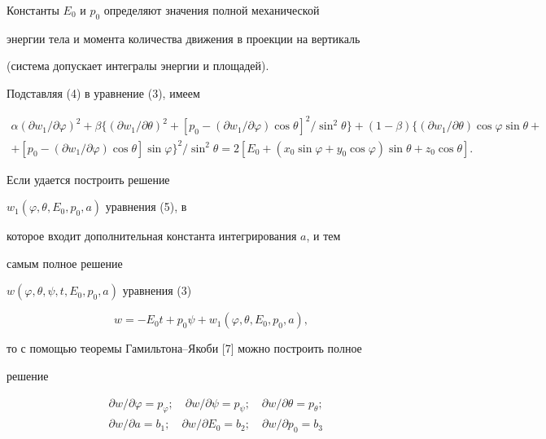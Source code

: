 Константы $E_0$ и $p_0$ определяют значения полной механической


энергии тела и момента количества движения в проекции на вертикаль


(система допускает интегралы энергии и площадей).





Подставляя (4) в уравнение (3), имеем


\begin{multline}


\alpha(\partial w_1/\partial\varphi)^2+\beta\{(


\partial w_1/\partial\theta)^2+[p_0-


(\partial w_1/\partial\varphi)\cos\theta]^2/\sin^2\theta\}+


(1-\beta)\{(\partial w_1/\partial\theta)\cos\varphi\sin\theta+\\


%


+[p_0-(\partial w_1/\partial\varphi)\cos\theta]\sin\varphi


\}^2/\sin^2\theta=2[E_0+(x_0\sin\varphi+y_0\cos\varphi)


\sin\theta+z_0\cos\theta].


\end{multline}


Если удается построить решение


$w_1(\varphi,\theta,E_0,p_0,a)$ уравнения (5), в


которое входит дополнительная константа интегрирования $a$, и тем


самым полное решение


$w(\varphi,\theta,\psi,t,E_0,p_0,a)$ уравнения (3)


\begin{equation}


w=-E_0t+p_0\psi+w_1(\varphi,\theta,E_0,p_0,a),


\end{equation}


то с помощью теоремы Гамильтона--Якоби [7] можно построить полное


решение


\begin{equation}


\begin{split}


&\partial w/\partial\varphi=p_\varphi;\quad


\partial w/\partial\psi=p_\psi;\quad


\partial w/\partial\theta=p_\theta;\\


&\partial w/\partial a=b_1;\quad


\partial w/\partial E_0=b_2;\quad


\partial w/\partial p_0=b_3


\end{split}


\end{equation}


